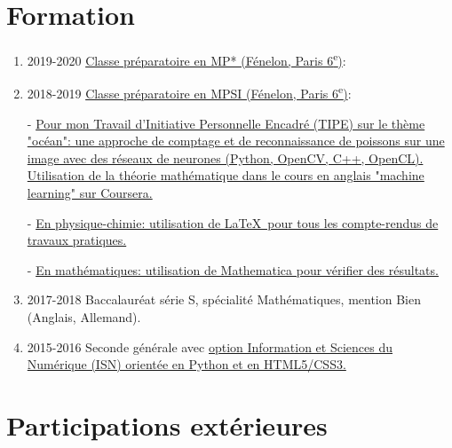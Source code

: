 \documentclass{article}
\begin{document}
	\section{Formation}

	\begin{enumerate}
		
		\item 2019-2020 \href{https://github.com/Benjamin-Loison/MPX}{Classe préparatoire en MP* (Fénelon, Paris 6\textsuperscript{e})}:

			\item 2018-2019 \href{https://github.com/Benjamin-Loison/MPSI1}{Classe préparatoire en MPSI (Fénelon, Paris 6\textsuperscript{e})}:
			
			- \href{https://github.com/Benjamin-Loison/MPSI1/tree/master/TIPE}{Pour mon Travail d'Initiative Personnelle Encadré (TIPE) sur le thème "océan": une approche de comptage et de reconnaissance de poissons sur une image avec des réseaux de neurones (Python, OpenCV, C++, OpenCL). Utilisation de la théorie mathématique dans le cours en anglais "machine learning" sur \href{https://www.coursera.org/learn/machine-learning?}{Coursera.}}
			
				- \href{https://github.com/Benjamin-Loison/MPSI1/blob/master/Physic-chemistry.zip}{En physique-chimie: utilisation de \LaTeX\ pour tous les compte-rendus de travaux pratiques.}
			
				- \href{https://github.com/Benjamin-Loison/MPSI1/tree/master/Mathematics}{En mathématiques: utilisation de Mathematica pour vérifier des résultats.}
		
			\item 2017-2018 Baccalauréat série S, spécialité Mathématiques, mention Bien (Anglais, Allemand).

			\item 2015-2016 Seconde générale avec \href{https://github.com/Benjamin-Loison/ISN-2-nde-French-educationnal-system-}{option Information et Sciences du Numérique (ISN) orientée en Python et en HTML5/CSS3.}
		
	\end{enumerate}

	\section{Participations extérieures}
\end{document}
